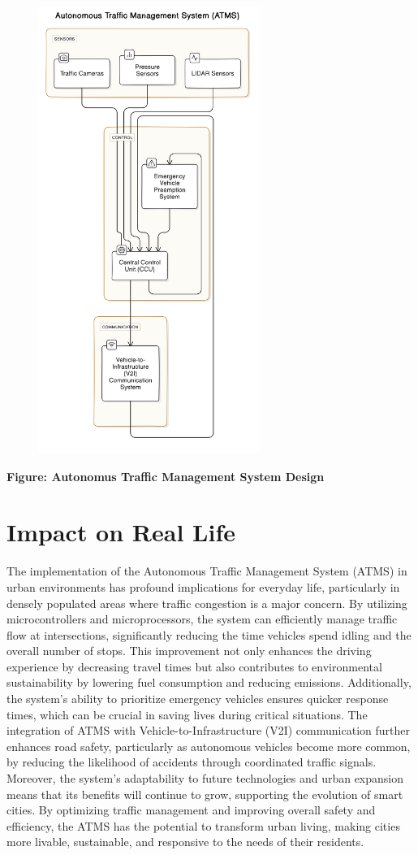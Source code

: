 \documentclass{scrreprt}
\begin{document}
\begin{center}
    {\includegraphics[width=350px, height=550px]{e.png}}
    \parbox{0.8\textwidth}{ 
        \centering
        \textbf{Figure: Autonomus Traffic Management System Design}
    }
\end{center}


\section*{Impact on Real Life}

The implementation of the Autonomous Traffic Management System (ATMS) in urban environments has profound implications for everyday life, particularly in densely populated areas where traffic congestion is a major concern. By utilizing microcontrollers and microprocessors, the system can efficiently manage traffic flow at intersections, significantly reducing the time vehicles spend idling and the overall number of stops. This improvement not only enhances the driving experience by decreasing travel times but also contributes to environmental sustainability by lowering fuel consumption and reducing emissions. Additionally, the system’s ability to prioritize emergency vehicles ensures quicker response times, which can be crucial in saving lives during critical situations. The integration of ATMS with Vehicle-to-Infrastructure (V2I) communication further enhances road safety, particularly as autonomous vehicles become more common, by reducing the likelihood of accidents through coordinated traffic signals. Moreover, the system's adaptability to future technologies and urban expansion means that its benefits will continue to grow, supporting the evolution of smart cities. By optimizing traffic management and improving overall safety and efficiency, the ATMS has the potential to transform urban living, making cities more livable, sustainable, and responsive to the needs of their residents.
\end{document}

